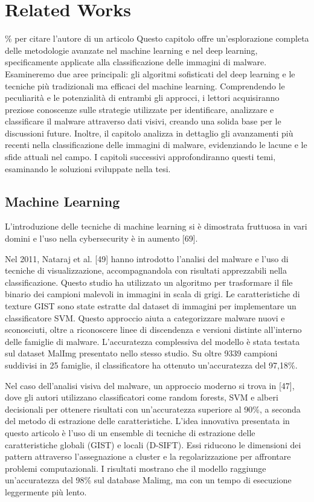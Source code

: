 \chapter{Related Works}
\label{cap:RelatedWorks}
\% per citare l'autore di un articolo
Questo capitolo offre un'esplorazione completa delle metodologie avanzate nel machine learning e nel deep learning, specificamente applicate alla classificazione delle immagini di malware. Esamineremo due aree principali: gli algoritmi sofisticati del deep learning e le tecniche più tradizionali ma efficaci del machine learning. Comprendendo le peculiarità e le potenzialità di entrambi gli approcci, i lettori acquisiranno preziose conoscenze sulle strategie utilizzate per identificare, analizzare e classificare il malware attraverso dati visivi, creando una solida base per le discussioni future. Inoltre, il capitolo analizza in dettaglio gli avanzamenti più recenti nella classificazione delle immagini di malware, evidenziando le lacune e le sfide attuali nel campo. I capitoli successivi approfondiranno questi temi, esaminando le soluzioni sviluppate nella tesi.

\section{Machine Learning}
L'introduzione delle tecniche di machine learning si è dimostrata fruttuosa in vari domini e l'uso nella cybersecurity è in aumento [69].

Nel 2011, Nataraj et al. [49] hanno introdotto l'analisi del malware e l'uso di tecniche di visualizzazione, accompagnandola con risultati apprezzabili nella classificazione. Questo studio ha utilizzato un algoritmo per trasformare il file binario dei campioni malevoli in immagini in scala di grigi. Le caratteristiche di texture GIST sono state estratte dal dataset di immagini per implementare un classificatore SVM. Questo approccio aiuta a categorizzare malware nuovi e sconosciuti, oltre a riconoscere linee di discendenza e versioni distinte all'interno delle famiglie di malware. L'accuratezza complessiva del modello è stata testata sul dataset MalImg presentato nello stesso studio. Su oltre 9339 campioni suddivisi in 25 famiglie, il classificatore ha ottenuto un'accuratezza del 97,18\%.

Nel caso dell'analisi visiva del malware, un approccio moderno si trova in [47], dove gli autori utilizzano classificatori come random forests, SVM e alberi decisionali per ottenere risultati con un'accuratezza superiore al 90\%, a seconda del metodo di estrazione delle caratteristiche. L'idea innovativa presentata in questo articolo è l'uso di un ensemble di tecniche di estrazione delle caratteristiche globali (GIST) e locali (D-SIFT). Essi riducono le dimensioni dei pattern attraverso l'assegnazione a cluster e la regolarizzazione per affrontare problemi computazionali. I risultati mostrano che il modello raggiunge un'accuratezza del 98\% sul database Malimg, ma con un tempo di esecuzione leggermente più lento.

